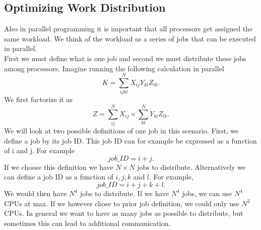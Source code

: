 \documentclass[a4paper,norsk,11pt,twoside]{report}
\begin{document}
\subsection{Optimizing Work Distribution \label{work_dist_section_1341}}
Also in parallel programming it is important that all processors get
assigned the same workload. We think of the workload as a series of
jobs that can be executed in parallel. \\

First we must define what is one job and second we must distribute these jobs among processors. Imagine running the following calculation in parallel
\begin{equation}
K = \sum_{ijkl}^N X_{ij} Y_{kl} Z_{lk} .
\end{equation}
We first factorize it as
\begin{equation}
Z = \sum_{ij}^N X_{ij} \times \sum_{kl}^N Y_{kl} Z_{lk} .
\end{equation}
We will look at two possible definitions of one job in this
scenario. First, we define a job by its job ID. This job ID can for
example be expressed as a function of i and j. For example
\begin{equation}
job\_ID = i + j . \label{example_job_distribution}
\end{equation}
If we choose this definition we have $N \times N$ jobs to distribute. Alternatively we can define a job ID as a function of $i, j, k$ and $l$. For example,
\begin{equation}
job\_ID = i + j + k + l .
\end{equation}
We would then have $N^4$ jobs to distribute. If we have $N^4$ jobs, we can  use $N^4$ CPUs at max. If we however chose to prior job definition, we could only use $N^2$ CPUs. In general we want to have as many jobs as possible to distribute, but sometimes this can lead to additional communication. \\
\end{document}

